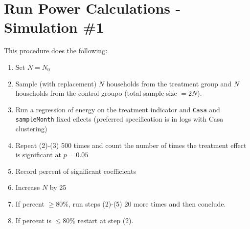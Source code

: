 \documentclass[10pt]{article}\usepackage[]{graphicx}\usepackage[]{color}
\begin{document}
\section{Run Power Calculations - Simulation \#1}
This procedure does the following:

\begin{enumerate}
\item Set $N = N_0$ 
\item Sample (with replacement) $N$ households from the treatment group and $N$ households from the control groupo (total sample size $=2N$).
\item Run a regression of energy on the treatment indicator and \texttt{Casa} and \texttt{sampleMonth} fixed effects (preferred specification is in logs with Casa clustering)
\item Repeat (2)-(3) 500 times and count the number of times the treatment effect is significant at $p = 0.05$
\item Record percent of significant coefficients
\item Increase $N$ by 25
\item If percent $\ge 80\%$, run steps (2)-(5) 20 more times and then conclude.
\item If percent is $\le 80\%$ restart at step (2).
\end{enumerate}
\end{document}
